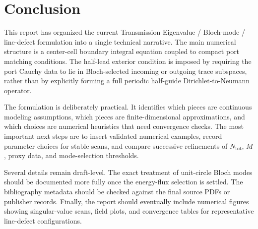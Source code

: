 %
%
%
%
%

\section{Conclusion}

This report has organized the current Transmission Eigenvalue / Bloch-mode /
line-defect formulation into a single technical narrative.  The main numerical
structure is a center-cell boundary integral equation coupled to compact port
matching conditions.  The half-lead exterior condition is imposed by requiring
the port Cauchy data to lie in Bloch-selected incoming or outgoing trace
subspaces, rather than by explicitly forming a full periodic half-guide
Dirichlet-to-Neumann operator.

The formulation is deliberately practical.  It identifies which pieces are
continuous modeling assumptions, which pieces are finite-dimensional
approximations, and which choices are numerical heuristics that need convergence
checks.  The most important next steps are to insert validated numerical
examples, record parameter choices for stable scans, and compare successive
refinements of \(N_{\mathrm{tot}}\), \(M\), proxy data, and mode-selection
thresholds.

Several details remain draft-level.  The exact treatment of unit-circle Bloch
modes should be documented more fully once the energy-flux selection is settled.
The bibliography metadata should be checked against the final source PDFs or
publisher records.  Finally, the report should eventually include numerical
figures showing singular-value scans, field plots, and convergence tables for
representative line-defect configurations.

